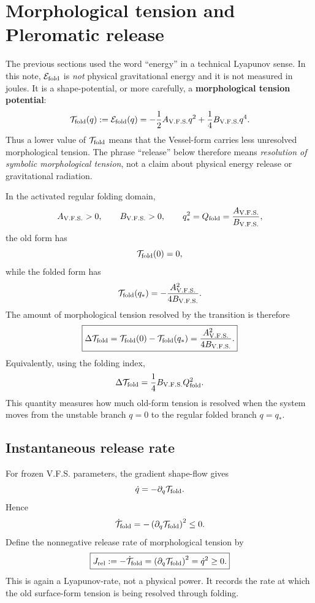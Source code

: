 \documentclass[11pt,a4paper]{article}
\newcommand{\VFS}{\ensuremath{\mathrm{V.F.S.}}}
\theoremstyle{plain}
\theoremstyle{remark}
\theoremstyle{definition}
\begin{document}
\section{Morphological tension and Pleromatic release}
The previous sections used the word ``energy'' in a technical Lyapunov sense. In this note,
\(\mathcal E_{\rm fold}\) is \emph{not} physical gravitational energy and it is not measured in
joules. It is a shape-potential, or more carefully, a \textbf{morphological tension potential}:
\[
\mathcal T_{\rm fold}(q):=\mathcal E_{\rm fold}(q)
=
-\frac12A_{\VFS}q^2+\frac14B_{\VFS}q^4.
\]
Thus a lower value of \(\mathcal T_{\rm fold}\) means that the Vessel-form carries less unresolved
morphological tension. The phrase ``release'' below therefore means \emph{resolution of symbolic
morphological tension}, not a claim about physical energy release or gravitational radiation.

In the activated regular folding domain,
\[
A_{\VFS}>0,
\qquad
B_{\VFS}>0,
\qquad
q_\ast^2=Q_{\rm fold}=\frac{A_{\VFS}}{B_{\VFS}},
\]
the old form has
\[
\mathcal T_{\rm fold}(0)=0,
\]
while the folded form has
\[
\mathcal T_{\rm fold}(q_\ast)
=
-\frac{A_{\VFS}^2}{4B_{\VFS}}.
\]
The amount of morphological tension resolved by the transition is therefore
\[
\boxed{
\Delta\mathcal T_{\rm fold}
=
\mathcal T_{\rm fold}(0)-\mathcal T_{\rm fold}(q_\ast)
=
\frac{A_{\VFS}^2}{4B_{\VFS}}.
}
\]
Equivalently, using the folding index,
\[
\Delta\mathcal T_{\rm fold}
=
\frac14 B_{\VFS}Q_{\rm fold}^2.
\]
This quantity measures how much old-form tension is resolved when the system moves from the
unstable branch \(q=0\) to the regular folded branch \(q=q_\ast\).

\subsection*{Instantaneous release rate}
For frozen V.F.S. parameters, the gradient shape-flow gives
\[
\dot q=-\partial_q\mathcal T_{\rm fold}.
\]
Hence
\[
\dot{\mathcal T}_{\rm fold}
=
-\left(\partial_q\mathcal T_{\rm fold}\right)^2
\le0.
\]
Define the nonnegative release rate of morphological tension by
\[
\boxed{
J_{\rm rel}
:=
-\dot{\mathcal T}_{\rm fold}
=
\left(\partial_q\mathcal T_{\rm fold}\right)^2
=
\dot q^2
\ge0.
}
\]
This is again a Lyapunov-rate, not a physical power. It records the rate at which the old
surface-form tension is being resolved through folding.
\end{document}
